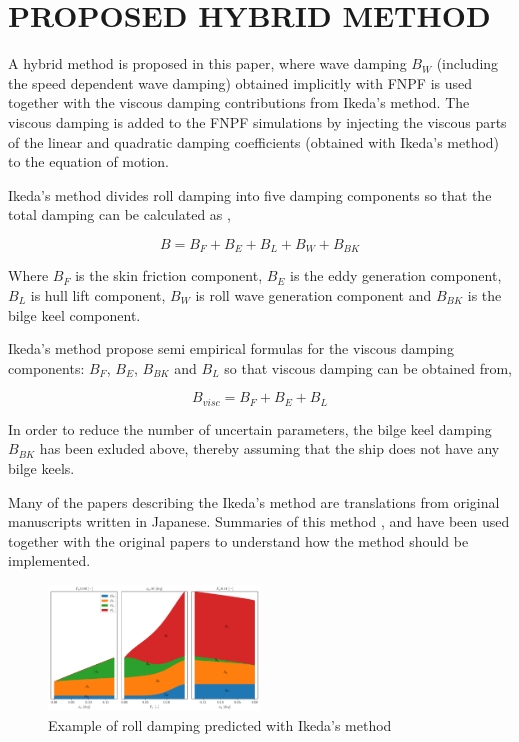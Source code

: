 \section*{PROPOSED HYBRID METHOD}\label{proposed-hybrid-method}

\quad A hybrid method is proposed in this paper, where wave damping $B_W$
(including the speed dependent wave damping) obtained implicitly with
FNPF is used together with the viscous damping contributions from
Ikeda's method. The viscous damping is added to the FNPF simulations by
injecting the viscous parts of the linear and quadratic damping
coefficients (obtained with Ikeda's method) to the equation of motion.

\quad Ikeda's method divides roll damping into five damping components so that
the total damping can be calculated as \citep{7505983/937PN5DT},

\quad \begin{equation}
B = B_F + B_E + B_L + B_W + B_{BK}
\end{equation}

\quad Where $B_F$ is the skin friction component, $B_E$ is the eddy
generation component, $B_L$ is hull lift component, $B_W$ is roll
wave generation component and $B_{BK}$ is the bilge keel component.

\quad Ikeda's method propose semi empirical formulas for the viscous damping
components: $B_F$, $B_E$, $B_{BK}$ and $B_L$ so that viscous
damping can be obtained from,

\quad \begin{equation}
\label{eq:viscous damping}
B_{visc} = B_F + B_E + B_L
\end{equation}

\quad In order to reduce the number of uncertain parameters, the bilge keel
damping $B_{BK}$ has been exluded above, thereby assuming that the
ship does not have any bilge keels.

\quad Many of the papers describing the Ikeda's method are translations from
original manuscripts written in Japanese. Summaries of this method
\citep{7505983/FB64RGPF}, \citep{7505983/KAKIM2E2} and
\citep{7505983/UGK6YEVD} have been used together with the original papers
to understand how the method should be implemented.
\citep{7505983/UGK6YEVD}

\quad     

\quad     
    \begin{figure}[H]
        \begin{center}\includegraphics[width = 0.5\textwidth]{figures/ikeda_generic.pdf}\end{center}
        \vspace{-1cm}
        \caption{Example of roll damping predicted with Ikeda's method}
        \label{fig:ikeda_generic}
    \end{figure}
    

